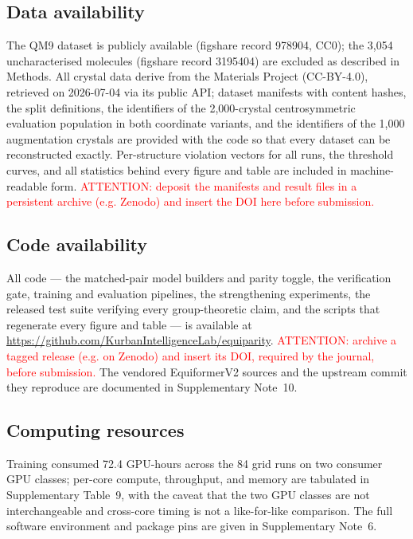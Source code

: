 \subsection*{Data availability}

The QM9 dataset is publicly available (figshare record 978904, CC0); the 3,054 uncharacterised molecules (figshare record 3195404) are excluded as described in Methods. All crystal data derive from the Materials Project (CC-BY-4.0), retrieved on 2026-07-04 via its public API; dataset manifests with content hashes, the split definitions, the identifiers of the 2,000-crystal centrosymmetric evaluation population in both coordinate variants, and the identifiers of the 1,000 augmentation crystals are provided with the code so that every dataset can be reconstructed exactly. Per-structure violation vectors for all runs, the threshold curves, and all statistics behind every figure and table are included in machine-readable form. \textcolor{red}{ATTENTION: deposit the manifests and result files in a persistent archive (e.g. Zenodo) and insert the DOI here before submission.}

\subsection*{Code availability}

All code --- the matched-pair model builders and parity toggle, the verification gate, training and evaluation pipelines, the strengthening experiments, the released test suite verifying every group-theoretic claim, and the scripts that regenerate every figure and table --- is available at \url{https://github.com/KurbanIntelligenceLab/equiparity}. \textcolor{red}{ATTENTION: archive a tagged release (e.g. on Zenodo) and insert its DOI, required by the journal, before submission.} The vendored EquiformerV2 sources and the upstream commit they reproduce are documented in Supplementary Note~10.

\subsection*{Computing resources}

Training consumed 72.4 GPU-hours across the 84 grid runs on two consumer GPU classes; per-core compute, throughput, and memory are tabulated in Supplementary Table~9, with the caveat that the two GPU classes are not interchangeable and cross-core timing is not a like-for-like comparison. The full software environment and package pins are given in Supplementary Note~6.

